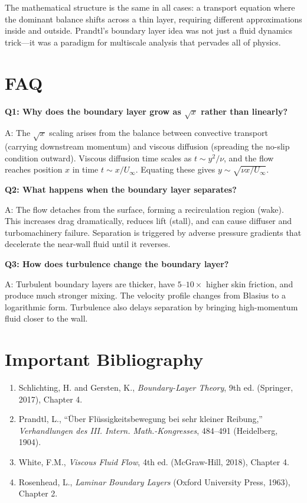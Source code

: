 \documentclass[11pt,openright]{book}
\begin{document}
The mathematical structure is the same in all cases: a transport equation where the dominant balance shifts across a thin layer, requiring different approximations inside and outside. Prandtl's boundary layer idea was not just a fluid dynamics trick---it was a paradigm for multiscale analysis that pervades all of physics.


\section*{FAQ}

\textbf{Q1: Why does the boundary layer grow as $\sqrt{x}$ rather than linearly?}

A: The $\sqrt{x}$ scaling arises from the balance between convective transport (carrying downstream momentum) and viscous diffusion (spreading the no-slip condition outward). Viscous diffusion time scales as $t \sim y^2/\nu$, and the flow reaches position $x$ in time $t \sim x/U_\infty$. Equating these gives $y \sim \sqrt{\nu x / U_\infty}$.

\textbf{Q2: What happens when the boundary layer separates?}

A: The flow detaches from the surface, forming a recirculation region (wake). This increases drag dramatically, reduces lift (stall), and can cause diffuser and turbomachinery failure. Separation is triggered by adverse pressure gradients that decelerate the near-wall fluid until it reverses.

\textbf{Q3: How does turbulence change the boundary layer?}

A: Turbulent boundary layers are thicker, have $5$--$10\times$ higher skin friction, and produce much stronger mixing. The velocity profile changes from Blasius to a logarithmic form. Turbulence also delays separation by bringing high-momentum fluid closer to the wall.
\section*{Important Bibliography}

\begin{enumerate}
\item Schlichting, H. and Gersten, K., \textit{Boundary-Layer Theory}, 9th ed. (Springer, 2017), Chapter 4.
\item Prandtl, L., ``\"Uber Fl\"ussigkeitsbewegung bei sehr kleiner Reibung,'' \textit{Verhandlungen des III. Intern. Math.-Kongresses}, 484--491 (Heidelberg, 1904).
\item White, F.M., \textit{Viscous Fluid Flow}, 4th ed. (McGraw-Hill, 2018), Chapter 4.
\item Rosenhead, L., \textit{Laminar Boundary Layers} (Oxford University Press, 1963), Chapter 2.
\end{enumerate}
\end{document}

